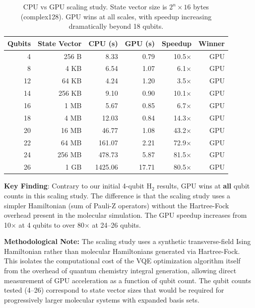 \documentclass[11pt]{article}
\begin{document}
\begin{table}[h]
    \centering
    \begin{tabular}{rrrrrr}
        \toprule
        \textbf{Qubits} & \textbf{State Vector} & \textbf{CPU (s)} & \textbf{GPU (s)} & \textbf{Speedup} & \textbf{Winner} \\
        \midrule
        4  & 256 B     & 8.33   & 0.79   & 10.5$\times$ & GPU \\
        8  & 4 KB      & 6.54   & 1.07   & 6.1$\times$  & GPU \\
        12 & 64 KB     & 4.24   & 1.20   & 3.5$\times$  & GPU \\
        14 & 256 KB    & 9.10   & 0.90   & 10.1$\times$ & GPU \\
        16 & 1 MB      & 5.67   & 0.85   & 6.7$\times$  & GPU \\
        18 & 4 MB      & 12.03  & 0.84   & 14.3$\times$ & GPU \\
        20 & 16 MB     & 46.77  & 1.08   & 43.2$\times$ & GPU \\
        22 & 64 MB     & 161.07 & 2.21   & 72.9$\times$ & GPU \\
        24 & 256 MB    & 478.73 & 5.87   & 81.5$\times$ & GPU \\
        26 & 1 GB      & 1425.06 & 17.71 & 80.5$\times$ & GPU \\
        \bottomrule
    \end{tabular}
    \caption{CPU vs GPU scaling study. State vector size is $2^n \times 16$ bytes (complex128). GPU wins at all scales, with speedup increasing dramatically beyond 18 qubits.}
    \label{tab:gpu_scaling}
\end{table}

\textbf{Key Finding}: Contrary to our initial 4-qubit H$_2$ results, GPU wins at \textbf{all} qubit counts in this scaling study. The difference is that the scaling study uses a simpler Hamiltonian (sum of Pauli-Z operators) without the Hartree-Fock overhead present in the molecular simulation. The GPU speedup increases from 10$\times$ at 4 qubits to over 80$\times$ at 24--26 qubits.

\textbf{Methodological Note:} The scaling study uses a synthetic transverse-field Ising Hamiltonian rather than molecular Hamiltonians generated via Hartree-Fock. This isolates the computational cost of the VQE optimization algorithm itself from the overhead of quantum chemistry integral generation, allowing direct measurement of GPU acceleration as a function of qubit count. The qubit counts tested (4--26) correspond to state vector sizes that would be required for progressively larger molecular systems with expanded basis sets.
\end{document}
